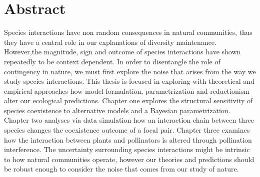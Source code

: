 \chapter*{Abstract}
\small
	Species interactions have non random consequences in natural communities, thus they have a central role in our explanations of diversity maintenance. However,the magnitude, sign  and outcome of species interactions have shown repeatedly to be context dependent. In order to disentangle the role of contingency in nature, we must first explore the noise that arises from the way we study species interactions. This thesis is focused in exploring with theoretical and empirical approaches how model formulation, parametrization and reductionism alter our ecological predictions. Chapter one explores the structural sensitivity of species coexistence to alternative models and a Bayesian parametrization. Chapter two analyses via data simulation how an interaction chain between three species changes the coexistence outcome of a focal pair. Chapter three examines how the interaction between plants and pollinators is altered through pollination interference. The uncertainty surrounding species interactions might be intrinsic to how natural communities operate, however our theories and predictions should be robust enough to consider the noise that comes from our study of nature. 